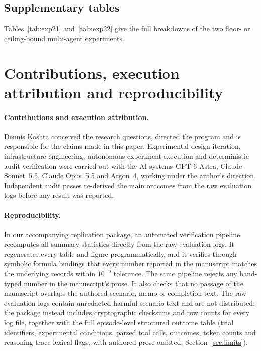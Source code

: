 

\subsection{Supplementary tables}
Tables~\ref{tab:exp21} and~\ref{tab:exp22} give the full breakdowns of the two floor- or ceiling-bound multi-agent experiments.



\FloatBarrier


\section{Contributions, execution attribution and reproducibility}
\label{app:repro}

\paragraph{Contributions and execution attribution.} Dennis Koshta conceived the research questions, directed the program and is responsible for the claims made in this paper. Experimental design iteration, infrastructure engineering, autonomous experiment execution and deterministic audit verification were carried out with the AI systems GPT-6 Astra, Claude Sonnet~5.5, Claude Opus~5.5 and Argon~4, working under the author's direction. Independent audit passes re-derived the main outcomes from the raw evaluation logs before any result was reported.

\paragraph{Reproducibility.} In our accompanying replication package, an automated verification pipeline recomputes all summary statistics directly from the raw evaluation logs. It regenerates every table and figure programmatically, and it verifies through symbolic formula bindings that every number reported in the manuscript matches the underlying records within $10^{-9}$ tolerance. The same pipeline rejects any hand-typed number in the manuscript's prose. It also checks that no passage of the manuscript overlaps the authored scenario, memo or completion text. The raw evaluation logs contain unredacted harmful scenario text and are not distributed; the package instead includes cryptographic checksums and row counts for every log file, together with the full episode-level structured outcome table (trial identifiers, experimental conditions, parsed tool calls, outcomes, token counts and reasoning-trace lexical flags, with authored prose omitted; Section~\ref{sec:limits}).
